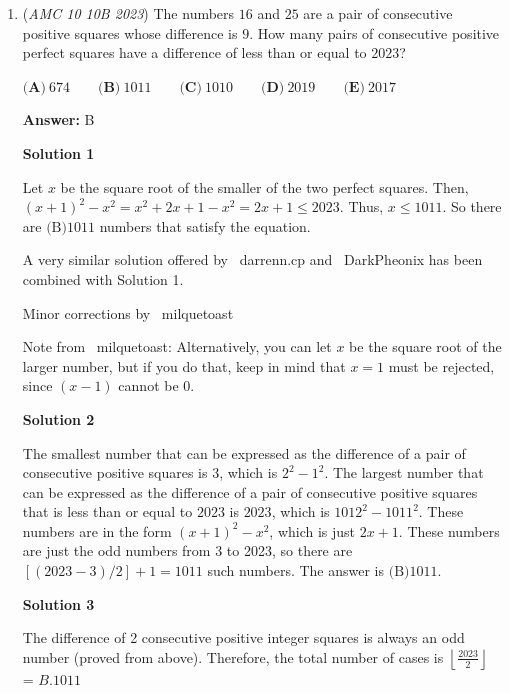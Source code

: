 \begin{enumerate}
$2022^{2023}\equiv 2^{2023}=128^{289}\equiv 8^{289}=2^{289\times3}=131072^{51}\equiv 2^{51}=131072^3\equiv 2^3=8$ $(\text{mod}$ $10)$$2023^{2022}\equiv 3^{2022}=9^{1011}\equiv (-1)^{1011}=-1\equiv 9$ $(\text{mod}$ $10)$
$8+9=17\equiv 7$ $(\text{mod}$ $10)$



	\item (\textit{AMC 10 10B 2023}) The numbers $16$ and $25$ are a pair of consecutive positive squares whose difference is $9$. How many pairs of consecutive positive perfect squares have a difference of less than or equal to $2023$?


 $\textbf{(A)}\ 674 \qquad \textbf{(B)}\ 1011 \qquad \textbf{(C)}\ 1010 \qquad \textbf{(D)}\ 2019 \qquad \textbf{(E)}\ 2017$

 \textbf{Answer: }B



\textbf{Solution 1}

Let $x$ be the square root of the smaller of the two perfect squares. Then, $(x+1)^2 - x^2 =x^2+2x+1-x^2 = 2x+1 \le 2023$. Thus, $x \le 1011$. So there are $\boxed{\text{(B)}1011}$ numbers that satisfy the equation. 

 A very similar solution offered by ~darrenn.cp and ~DarkPheonix has been combined with Solution 1.

 Minor corrections by ~milquetoast

 Note from ~milquetoast: Alternatively, you can let $x$ be the square root of the larger number, but if you do that, keep in mind that $x=1$ must be rejected, since $(x-1)$ cannot be $0$.

 



\textbf{Solution 2}

The smallest number that can be expressed as the difference of a pair of consecutive positive squares is $3$, which is $2^2-1^2$. The largest number that can be expressed as the difference of a pair of consecutive positive squares that is less than or equal to $2023$ is $2023$, which is $1012^2-1011^2$. These numbers are in the form $(x+1)^2-x^2$, which is just $2x+1$. These numbers are just the odd numbers from 3 to 2023, so there are $[(2023-3)/2]+1=1011$ such numbers. The answer is $\boxed{\text{(B)}1011}$.

 



\textbf{Solution 3}

The difference of 2 consecutive positive integer squares is always an odd number (proved from above). Therefore, the total number of cases is \(\left\lfloor \frac{2023}{2} \right\rfloor\) = $\boxed{B.1011}$





\end{enumerate}
